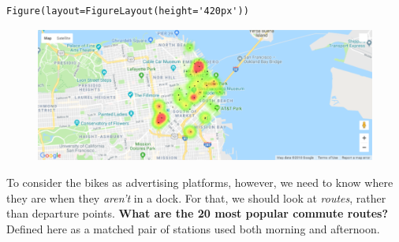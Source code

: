 \documentclass[11pt]{article}
\makeatletter
\def\maxwidth{\ifdim\Gin@nat@width>\linewidth\linewidth
    \else\Gin@nat@width\fi}
\let\Oldincludegraphics\includegraphics
\renewcommand{\includegraphics}[1]{\Oldincludegraphics[width=.8\maxwidth]{#1}}
\makeatother
\begin{document}
    
    \begin{verbatim}
Figure(layout=FigureLayout(height='420px'))
    \end{verbatim}

    
    \begin{figure}[htbp]
\centering
\includegraphics{imgs/commute_stations_eve.png}
\caption{}
\end{figure}

    To consider the bikes as advertising platforms, however, we need to know
where they are when they \emph{aren't} in a dock. For that, we should
look at \emph{routes}, rather than departure points. \textbf{What are
the 20 most popular commute routes?} Defined here as a matched pair of
stations used both morning and afternoon.
\end{document}
